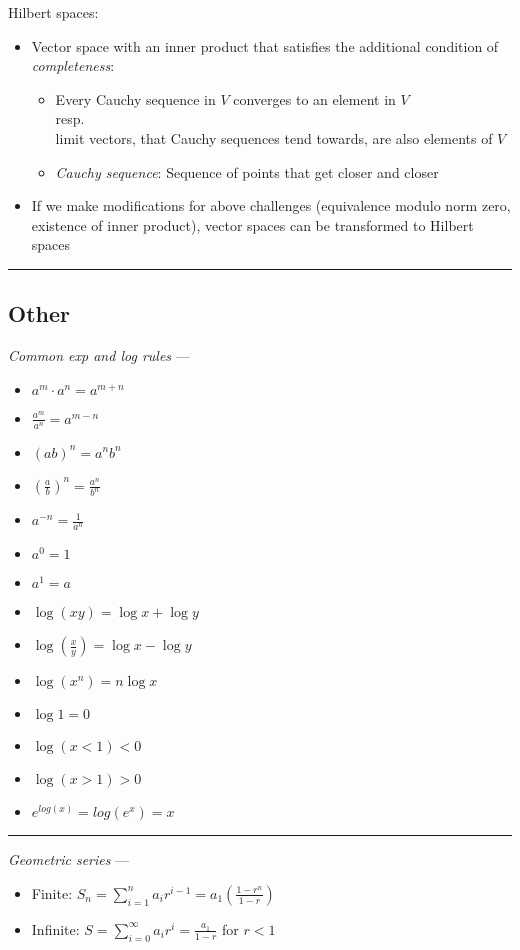 Hilbert spaces:
\begin{itemize}
    \item Vector space with an inner product that satisfies the additional condition of \emph{completeness}:
    \begin{itemize}
        \item Every Cauchy sequence in $V$ converges to an element in $V$\\
        resp.\\
        limit vectors, that Cauchy sequences tend towards, are also elements of $V$
        \item \emph{Cauchy sequence}: Sequence of points that get closer and closer
    \end{itemize}
    \item If we make modifications for above challenges (equivalence modulo norm zero, existence of inner product), vector spaces can be transformed to Hilbert spaces
\end{itemize}

{\color{black}\hrule height 0.001mm}

\subsection*{Other}
\emph{Common exp and log rules} ---
\begin{multicols}{2}
\begin{itemize}
    \item $a^m \cdot a^n = a^{m+n}$
    \item $\frac{a^m}{a^n} = a^{m-n}$
    \item $(ab)^n = a^n b^n$
    \item $\left(\frac{a}{b}\right)^n = \frac{a^n}{b^n}$
    \item $a^{-n} = \frac{1}{a^n}$
    \item $a^0 = 1$
    \item $a^1 = a$
    \item $\log(xy) = \log x + \log y$
    \item $\log\left(\frac{x}{y}\right) = \log x - \log y$
    \item $\log(x^n) = n \log x$
    \item $\log 1 = 0$
    \item $\log (x<1) < 0$
    \item $\log (x>1) > 0$
    \item $e^{log(x)} = log(e^x) = x$
\end{itemize}
\end{multicols}

{\color{lightgray}\hrule height 0.001mm}
\emph{Geometric series} --- 
\begin{itemize}
    \item Finite: $S_n = \sum_{i=1}^n a_i r^{i-1} = a_1 (\frac{1-r^n}{1-r})$
    \item Infinite: $S = \sum_{i=0}^\infty a_i r^i = \frac{a_1}{1-r}$ for $r < 1$
\end{itemize}